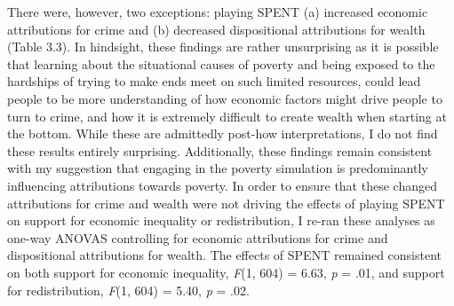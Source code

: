 \documentclass{sfuthesis}
\begin{document}
There were, however, two exceptions: playing SPENT (a) increased economic attributions for crime and (b) decreased dispositional attributions for wealth (Table 3.3). In hindsight, these findings are rather unsurprising as it is possible that learning about the situational causes of poverty and being exposed to the hardships of trying to make ends meet on such limited resources, could lead people to be more understanding of how economic factors might drive people to turn to crime, and how it is extremely difficult to create wealth when starting at the bottom. While these are admittedly post-how interpretations, I do not find these results entirely surprising. Additionally, these findings remain consistent with my suggestion that engaging in the poverty simulation is predominantly influencing attributions towards poverty. In order to ensure that these changed attributions for crime and wealth were not driving the effects of playing SPENT on support for economic inequality or redistribution, I re-ran these analyses as one-way ANOVAS controlling for economic attributions for crime and dispositional attributions for wealth. The effects of SPENT remained consistent on both support for economic inequality, \textit{F}(1, 604) = 6.63, \textit{p} = .01, and support for redistribution, \textit{F}(1, 604) = 5.40, \textit{p} = .02.
\end{document}
